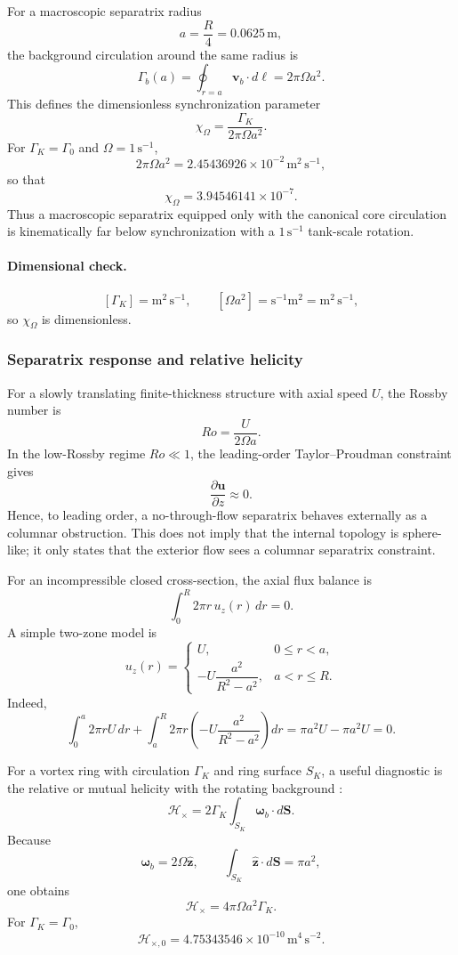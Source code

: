 For a macroscopic separatrix radius
\[
a=\frac{R}{4}=0.0625\,\mathrm m,
\]
the background circulation around the same radius is
\[
\Gamma_b(a)=\oint_{r=a}\mathbf v_b\cdot d\boldsymbol\ell
=2\pi\Omega a^2.
\]
This defines the dimensionless synchronization parameter
\[
\boxed{
\chi_\Omega=\frac{\Gamma_K}{2\pi\Omega a^2}.
}
\]
For \(\Gamma_K=\Gamma_0\) and \(\Omega=1\,\mathrm{s^{-1}}\),
\[
2\pi\Omega a^2=2.45436926\times10^{-2}\,\mathrm{m^2\,s^{-1}},
\]
so that
\[
\boxed{
\chi_\Omega=3.94546141\times10^{-7}.
}
\]
Thus a macroscopic separatrix equipped only with the canonical core circulation
is kinematically far below synchronization with a \(1\,\mathrm{s^{-1}}\)
tank-scale rotation.

\paragraph{Dimensional check.}
\[
[\Gamma_K]=\mathrm{m^2\,s^{-1}},
\qquad
[\Omega a^2]=\mathrm{s^{-1}m^2}=\mathrm{m^2\,s^{-1}},
\]
so \(\chi_\Omega\) is dimensionless.

\subsubsection{Separatrix response and relative helicity}

For a slowly translating finite-thickness structure with axial speed \(U\), the
Rossby number is
\[
Ro=\frac{U}{2\Omega a}.
\]
In the low-Rossby regime \(Ro\ll1\), the leading-order Taylor--Proudman
constraint gives
\[
\frac{\partial\mathbf u}{\partial z}\approx0.
\]
Hence, to leading order, a no-through-flow separatrix behaves externally as a
columnar obstruction.  This does not imply that the internal topology is
sphere-like; it only states that the exterior flow sees a columnar separatrix
constraint.

For an incompressible closed cross-section, the axial flux balance is
\[
\boxed{
\int_0^R2\pi r\,u_z(r)\,dr=0.
}
\]
A simple two-zone model is
\[
u_z(r)=
\begin{cases}
U, & 0\le r<a,\\[1mm]
-U\dfrac{a^2}{R^2-a^2}, & a<r\le R.
\end{cases}
\]
Indeed,
\[
\int_0^a2\pi rU\,dr
+
\int_a^R2\pi r\left(-U\frac{a^2}{R^2-a^2}\right)dr
=\pi a^2U-\pi a^2U=0.
\]

For a vortex ring with circulation \(\Gamma_K\) and ring surface \(S_K\), a
useful diagnostic is the relative or mutual helicity with the rotating
background \cite{Moffatt1969}:
\[
\boxed{
\mathcal H_{\times}
=2\Gamma_K\int_{S_K}\boldsymbol\omega_b\cdot d\mathbf S.
}
\]
Because
\[
\boldsymbol\omega_b=2\Omega\hat{\mathbf z},
\qquad
\int_{S_K}\hat{\mathbf z}\cdot d\mathbf S=\pi a^2,
\]
one obtains
\[
\boxed{
\mathcal H_{\times}=4\pi\Omega a^2\Gamma_K.
}
\]
For \(\Gamma_K=\Gamma_0\),
\[
\boxed{
\mathcal H_{\times,0}
=4.75343546\times10^{-10}\,\mathrm{m^4\,s^{-2}}.
}
\]

